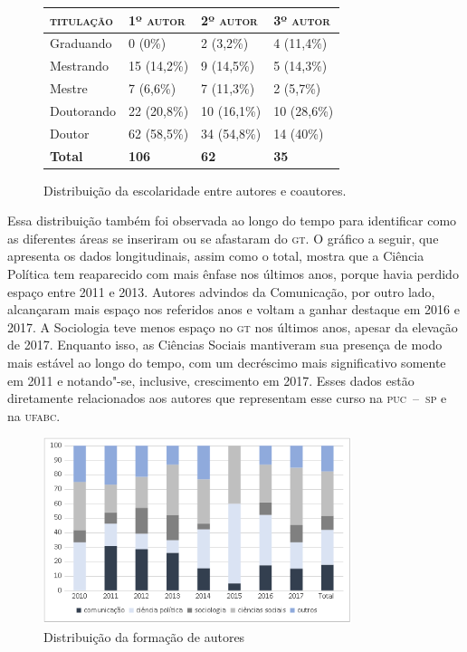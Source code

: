 {\begin{figure}[!ht]
\begin{center}
\begin{tabular}{|l|l|l|l|}
\hline
\textsc{titulação} & \textsc{1º autor} & \textsc{2º autor} & \textsc{3º autor} \\ \hline\hline
Graduando          & 0 (0\%)           & 2 (3,2\%)         & 4 (11,4\%)        \\ \hline
Mestrando          & 15 (14,2\%)       & 9 (14,5\%)        & 5 (14,3\%)        \\ \hline
Mestre             & 7 (6,6\%)         & 7 (11,3\%)        & 2 (5,7\%)         \\ \hline
Doutorando         & 22 (20,8\%)       & 10 (16,1\%)       & 10 (28,6\%)       \\ \hline
Doutor             & 62 (58,5\%)       & 34 (54,8\%)       & 14 (40\%)         \\ \hline
\textbf{Total} 		& \textbf{106} 		& \textbf{62}  &	\textbf{35}		\\ \hline
\end{tabular}
\end{center}

\caption{Distribuição da escolaridade entre autores e coautores.\footnotemark}
\end{figure}


Essa distribuição também foi observada ao longo do tempo para
identificar como as diferentes áreas se inseriram ou se afastaram do \textsc{gt}.
O gráfico a seguir, que apresenta os dados longitudinais, assim como o
total, mostra que a Ciência Política tem reaparecido com mais ênfase nos
últimos anos, porque havia perdido espaço entre 2011 e 2013. Autores
advindos da Comunicação, por outro lado, alcançaram mais espaço nos
referidos anos e voltam a ganhar destaque em 2016 e 2017. A Sociologia
teve menos espaço no \textsc{gt} nos últimos anos, apesar da elevação de 2017.
Enquanto isso, as Ciências Sociais mantiveram sua presença de modo mais
estável ao longo do tempo, com um decréscimo mais significativo somente
em 2011 e notando"-se, inclusive, crescimento em 2017. Esses dados estão
diretamente relacionados aos autores que representam esse curso na
\textsc{puc~--~sp} e na \textsc{ufabc}.


\pagebreak
 \begin{figure}[!ht]
 \centering
  \includegraphics[width=90mm]{./imgs/graf3_4.png}
 \caption{Distribuição da formação de autores\footnotemark}
 \end{figure}

}
